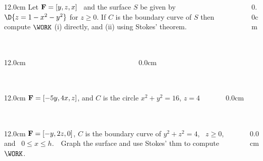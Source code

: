 \begin{frame}
\frametitle{}
\scriptsize
\begin{columns}
\begin{column}{12.0cm}
\EX Let ${\bf F} = [y,z,x]$ \, and the surface $S$ be given by \,$\D{z = 1 - x^2 - y^2}$ for $z\ge0$.  If $C$ is the boundary curve of $S$ then compute $\WORK$ \quad (i) directly, and (ii) using Stokes' theorem.

\vspace{8.2cm}

\end{column}
\begin{column}{0.0cm}\end{column}
\end{columns}
\end{frame}

\begin{frame}
\frametitle{}
\scriptsize
\begin{columns}
\begin{column}{12.0cm}
	
\end{column}
\begin{column}{0.0cm}\end{column}
\end{columns}
\end{frame}

\begin{frame}
\frametitle{}
\scriptsize
\begin{columns}
\begin{column}{12.0cm}
\EX ${\bf F} = [-5y,4x,z]$, and $C$ is the circle $x^2 + y^2 = 16$, $z=4$	

\vspace{9.2cm}

\end{column}
\begin{column}{0.0cm}\end{column}
\end{columns}
\end{frame}

\begin{frame}
\frametitle{}
\scriptsize
\begin{columns}
\begin{column}{12.0cm}
\EX ${\bf F} = [-y,2z,0]$, $C$ is the boundary curve of $y^2+z^2=4$, \, $z \ge 0$, \, and \, $0 \le x \le h$.  \,\, Graph the surface and use Stokes' thm to compute \,\, $\WORK$.

\vspace{8.2cm}

\end{column}
\begin{column}{0.0cm}\end{column}
\end{columns}
\end{frame}

